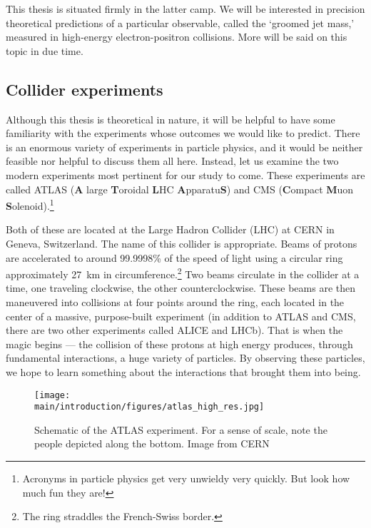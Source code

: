 \documentclass[12pt,twoside,class=../reedthesis, crop=false]{standalone}
\begin{document}
	This thesis is situated firmly in the latter camp. We will be interested in precision theoretical predictions of a particular observable, called the `groomed jet mass,' measured in high-energy electron-positron collisions. More will be said on this topic in due time.


\subsection{Collider experiments}
	Although this thesis is theoretical in nature, it will be helpful to have some familiarity with the experiments whose outcomes we would like to predict. There is an enormous variety of experiments in particle physics, and it would be neither feasible nor helpful to discuss them all here. Instead, let us examine the two modern experiments most pertinent for our study to come. These experiments are called ATLAS (\textbf{A} large \textbf{T}oroidal \textbf{L}HC \textbf{A}pparatu\textbf{S}) and CMS (\textbf{C}ompact \textbf{M}uon \textbf{S}olenoid).\footnote{Acronyms in particle physics get very unwieldy very quickly. But look how much fun they are!} 

	Both of these are located at the Large Hadron Collider (LHC) at CERN in Geneva, Switzerland. The name of this collider is appropriate. Beams of protons are accelerated to around 99.9998\% of the speed of light using a circular ring approximately \SI{27}{\kilo\metre} in circumference.\footnote{The ring straddles the French-Swiss border.} Two beams circulate in the collider at a time, one traveling clockwise, the other counterclockwise. These beams are then maneuvered into collisions at four points around the ring, each located in the center of a massive, purpose-built experiment (in addition to ATLAS and CMS, there are two other experiments called ALICE and LHCb). That is when the magic begins --- the collision of these protons at high energy produces, through fundamental interactions, a huge variety of particles. By observing these particles, we hope to learn something about the interactions that brought them into being.

	\begin{figure}
	\begin{center}
		\texttt{[image: \\main/introduction/figures/atlas\_high\_res.jpg]}
		\caption{\label{fig:atlas diagram}Schematic of the ATLAS experiment. For a sense of scale, note the people depicted along the bottom. Image from CERN \cite{cern_ac_layout_1998}}
	\end{center}
	\end{figure}
\end{document}
